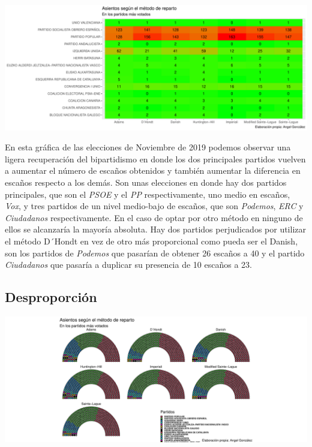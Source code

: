 \documentclass[12pt,a4paper,]{book}
\numberwithin{dummy}{section}
\theoremstyle{ocrenumbox}
\theoremstyle{blacknumex}
\theoremstyle{blacknumbox}
\theoremstyle{ocrenum}
\theoremstyle{ocrenum}
\begin{document}
\begin{center}\includegraphics[width=1\linewidth]{figurasR/unnamed-chunk-115-2} \end{center}

En esta gráfica de las elecciones de Noviembre de 2019 podemos observar
una ligera recuperación del bipartidismo en donde los dos principales
partidos vuelven a aumentar el número de escaños obtenidos y también
aumentar la diferencia en escaños respecto a los demás. Son unas
elecciones en donde hay dos partidos principales, que son el \emph{PSOE}
y el \emph{PP} respectivamente, uno medio en escaños, \emph{Vox}, y tres
partidos de un nivel medio-bajo de escaños, que son \emph{Podemos},
\emph{ERC} y \emph{Ciudadanos} respectivamente. En el caso de optar por
otro método en ninguno de ellos se alcanzaría la mayoría absoluta. Hay
dos partidos perjudicados por utilizar el método D´Hondt en vez de otro
más proporcional como pueda ser el Danish, son los partidos de
\emph{Podemos} que pasarían de obtener 26 escaños a 40 y el partido
\emph{Ciudadanos} que pasaría a duplicar su presencia de 10 escaños a
23.

\hypertarget{desproporciuxf3n-14}{%
\subsection{Desproporción}\label{desproporciuxf3n-14}}

\begin{center}\includegraphics[width=1\linewidth]{figurasR/unnamed-chunk-116-1} \end{center}
\end{document}
